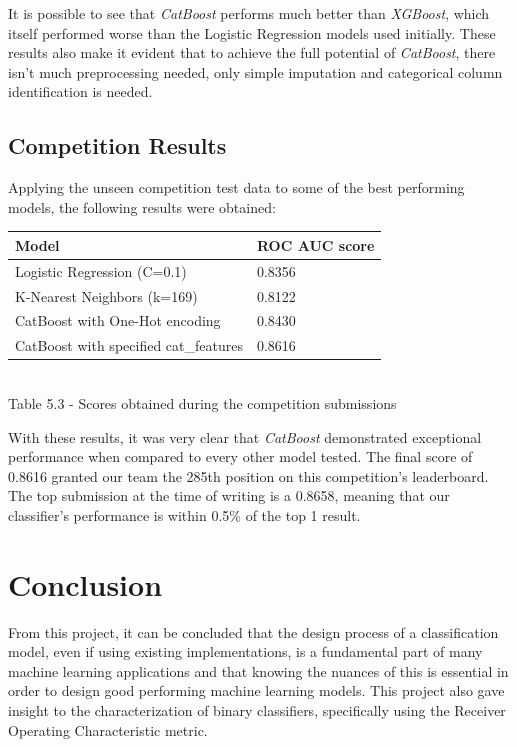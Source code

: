 \documentclass{IEEEtran}
\begin{document}
It is possible to see that \textit{CatBoost} performs much better than \textit{XGBoost}, which itself performed worse than the Logistic Regression models used initially. These results also make it evident that to achieve the full potential of \textit{CatBoost}, there isn't much preprocessing needed, only simple imputation and categorical column identification is needed.

\subsection{Competition Results}

Applying the unseen competition test data to some of the best performing models, the following results were obtained:

\begin{center}
    \begin{tabular}{|l|l|}
        \hline
    \textbf{Model} & \textbf{ROC AUC score} \\ 
    \hline \hline
    Logistic Regression (C=0.1) & 0.8356 \\ \hline
    K-Nearest Neighbors (k=169) & 0.8122 \\ \hline
    CatBoost with One-Hot encoding & 0.8430 \\ \hline
    CatBoost with specified cat\_features & 0.8616 \\ \hline
    \end{tabular}\\
    
    \vspace{6pt}
    Table 5.3 - Scores obtained during the competition submissions
\end{center}

With these results, it was very clear that \textit{CatBoost} demonstrated exceptional performance when compared to every other model tested. The final score of 0.8616 granted our team the 285th position on this competition's leaderboard. The top submission at the time of writing is a 0.8658, meaning that our classifier's performance is within 0.5\% of the top 1 result.

\section{Conclusion}

From this project, it can be concluded that the design process of a classification model, even if using existing implementations, is a fundamental part of many machine learning applications and that knowing the nuances of this is essential in order to design good performing machine learning models. This project also gave insight to the characterization of binary classifiers, specifically using the Receiver Operating Characteristic metric. 
\end{document}
